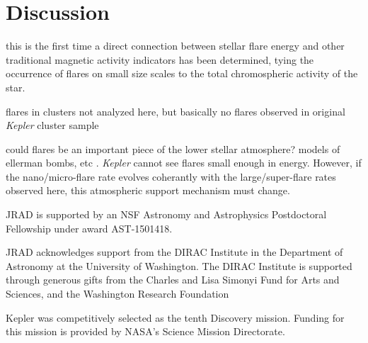 \documentclass[preprint2]{aastex62}
\newcommand{\Kepler}{\textsl{Kepler}\xspace}
\begin{document}
%





\section{Discussion}
\label{sec:discussion}

this is the first time a direct connection between stellar flare energy and other traditional magnetic activity indicators has been determined, tying the occurrence of flares on small size scales to the total chromospheric activity of the star.


flares in clusters not analyzed here, but basically no flares observed in original \Kepler cluster sample

could flares be an important piece of the lower stellar atmosphere? models of ellerman bombs, etc \citep[e.g.][]{hansteen2017}. \Kepler cannot see flares small enough in energy. However, if the nano/micro-flare rate evolves coherantly with the large/super-flare rates observed here, this atmospheric support mechanism must change.





\acknowledgments
JRAD is supported by an NSF Astronomy and Astrophysics Postdoctoral Fellowship under award AST-1501418.

JRAD acknowledges support from the DIRAC Institute in the Department of Astronomy at the University of Washington. The DIRAC Institute is supported through generous gifts from the Charles and Lisa Simonyi Fund for Arts and Sciences, and the Washington Research Foundation


Kepler was competitively selected as the tenth Discovery mission. Funding for this mission is provided by NASA's Science Mission Directorate.




\end{document}
